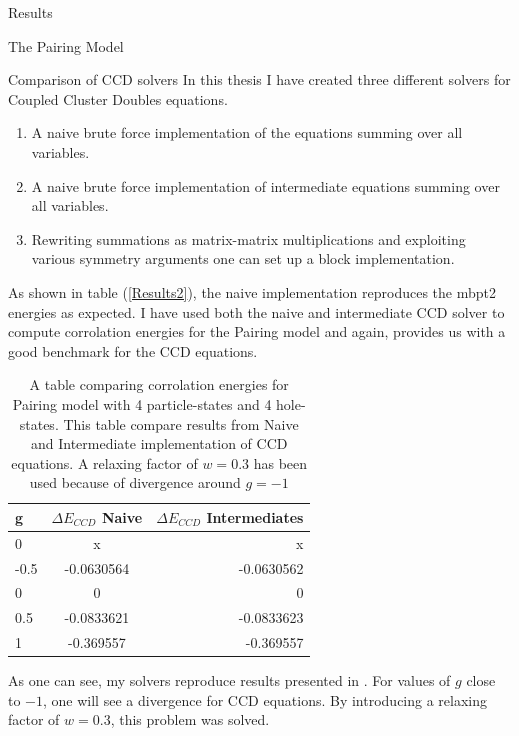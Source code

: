 \documentclass[twoside,english]{uiofysmaster}
\begin{document}
\begin{chapter}{Results}
\begin{section}{The Pairing Model}
		\begin{subsection}{Comparison of CCD solvers}
			In this thesis I have created three different solvers for Coupled Cluster Doubles equations. 
			\begin{enumerate}
				\item A naive brute force implementation of the equations summing over all variables. 
				\item A naive brute force implementation of intermediate equations summing over all variables.
				\item Rewriting summations as matrix-matrix multiplications and exploiting various symmetry arguments one can set up a block implementation.
			\end{enumerate}		
			As shown in table (\ref{Results2}), the naive implementation reproduces the mbpt2 energies as expected. I have used both the naive and intermediate CCD solver to compute corrolation energies for the Pairing model and again, \cite{Hjorth-Jensen2016} provides us with a good benchmark for the CCD equations.

			\begin{table}[H]
				\begin{center}
					\begin{tabular}[center]{l | c | r}
						g & $ \Delta E_{CCD}$ Naive  & $\Delta E_{CCD}$ Intermediates \\
						\hline
						0 & x & x \\
						-0.5 & -0.0630564 & -0.0630562 \\
						0 & 0 & 0 \\
						0.5 & -0.0833621 & -0.0833623 \\
						1 & -0.369557 & -0.369557
					\end{tabular}
				\end{center}
				\caption{A table comparing corrolation energies for Pairing model with 4 particle-states and 4 hole-states. This table compare results from Naive and Intermediate implementation of CCD equations. A relaxing factor of $w = 0.3$ has been used because of divergence around $g=-1$}
				\label{Results3}
			\end{table}
			As one can see, my solvers reproduce results presented in \cite{Hjorth-Jensen2016}. For values of $g$ close to $-1$, one will see a divergence for CCD equations. By introducing a relaxing factor of $w = 0.3$, this problem was solved. 
  

\end{subsection}
\end{section}
\end{chapter}
\end{document}
